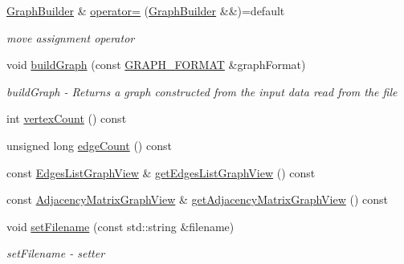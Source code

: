 \begin{DoxyCompactItemize}
\hyperlink{a00007}{Graph\+Builder} \& \hyperlink{a00007_a956ae5330a7549448b3a65d18ef3256f_a956ae5330a7549448b3a65d18ef3256f}{operator=} (\hyperlink{a00007}{Graph\+Builder} \&\&)=default
\begin{DoxyCompactList}\small\item\em move assignment operator \end{DoxyCompactList}\item 
void \hyperlink{a00007_af93f9ccc6ee766b6e9103b0410118251_af93f9ccc6ee766b6e9103b0410118251}{build\+Graph} (const \hyperlink{a00037_a1f61bb8d119aded91f38ff564193177c_a1f61bb8d119aded91f38ff564193177c}{G\+R\+A\+P\+H\+\_\+\+F\+O\+R\+M\+AT} \&graph\+Format)
\begin{DoxyCompactList}\small\item\em build\+Graph -\/ Returns a graph constructed from the input data read from the file \end{DoxyCompactList}\item 
int \hyperlink{a00007_a1f87c00f0c33d05c43c303d944e98e20_a1f87c00f0c33d05c43c303d944e98e20}{vertex\+Count} () const 
\item 
unsigned long \hyperlink{a00007_ab11f2d747657833d8858412550213206_ab11f2d747657833d8858412550213206}{edge\+Count} () const 
\item 
const \hyperlink{a00037_aa7134896d837083f384364b56a32bb49_aa7134896d837083f384364b56a32bb49}{Edges\+List\+Graph\+View} \& \hyperlink{a00007_a92a552ca053196f8f86f6449f47ed795_a92a552ca053196f8f86f6449f47ed795}{get\+Edges\+List\+Graph\+View} () const 
\item 
const \hyperlink{a00037_af657481a4b0a05546de6e9c1023bd9f5_af657481a4b0a05546de6e9c1023bd9f5}{Adjacency\+Matrix\+Graph\+View} \& \hyperlink{a00007_a54d8756fc2746a29b5cdb99a731ee9fb_a54d8756fc2746a29b5cdb99a731ee9fb}{get\+Adjacency\+Matrix\+Graph\+View} () const 
\item 
void \hyperlink{a00007_ae1e8d98a704fa5a7a5ad316259d95d6b_ae1e8d98a704fa5a7a5ad316259d95d6b}{set\+Filename} (const std\+::string \&filename)
\begin{DoxyCompactList}\small\item\em set\+Filename -\/ setter \end{DoxyCompactList}\end{DoxyCompactItemize}
